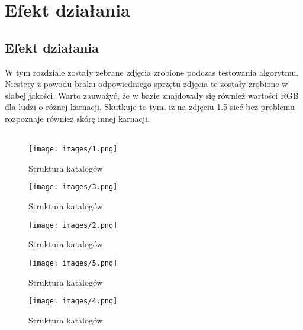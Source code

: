 \chapter{Efekt działania}
\label{cha:efekt}



\section{Efekt działania}
W tym rozdziale zostały zebrane zdjęcia zrobione podczas testowania algorytmu. Niestety z powodu braku odpowiedniego sprzętu zdjęcia te zostały zrobione w słabej jakości. Warto zauważyć, że w bazie znajdowały się również wartości RGB dla ludzi o różnej karnacji. Skutkuje to tym, iż na zdjęciu \ref{fig:5} sieć bez problemu rozpoznaje również skórę innej karnacji.\\ \\ 
\begin{figure}[tbph!]
\centering
\texttt{[image: images/1.png]}
\caption{Struktura katalogów}
\label{fig:1}
\end{figure}
\begin{figure}[tbph!]
\centering
\texttt{[image: images/3.png]}
\caption{Struktura katalogów}
\label{fig:2}
\end{figure}
\begin{figure}[tbph!]
\centering
\texttt{[image: images/2.png]}
\caption{Struktura katalogów}
\label{fig:3}
\end{figure}
\begin{figure}[tbph!]
\centering
\texttt{[image: images/5.png]}
\caption{Struktura katalogów}
\label{fig:4}
\end{figure}
\begin{figure}[tbph!]
\centering
\texttt{[image: images/4.png]}
\caption{Struktura katalogów}
\label{fig:5}
\end{figure}

